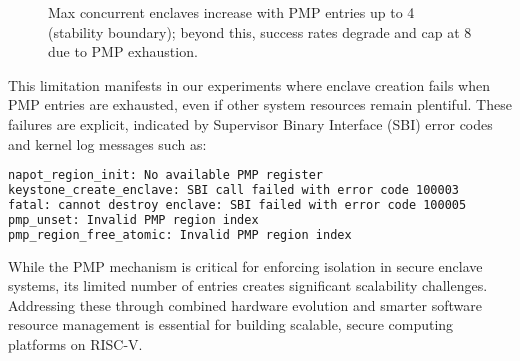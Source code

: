 \begin{figure}[htbp]
\centering
{}
\caption{Max concurrent enclaves increase with PMP entries up to 4 (stability boundary); beyond this, success rates degrade and cap at 8 due to PMP exhaustion.}
\end{figure}

This limitation manifests in our experiments where enclave creation fails when PMP entries are exhausted, even if other system resources remain plentiful. These failures are explicit, indicated by Supervisor Binary Interface (SBI) error codes and kernel log messages such as:

\begin{lstlisting}[language=bash,caption={Error messages during enclave creation and destruction}]
napot_region_init: No available PMP register
keystone_create_enclave: SBI call failed with error code 100003
fatal: cannot destroy enclave: SBI failed with error code 100005
pmp_unset: Invalid PMP region index
pmp_region_free_atomic: Invalid PMP region index
\end{lstlisting}

While the PMP mechanism is critical for enforcing isolation in secure enclave systems, its limited number of entries creates significant scalability challenges. Addressing these through combined hardware evolution and smarter software resource management is essential for building scalable, secure computing platforms on RISC-V.


